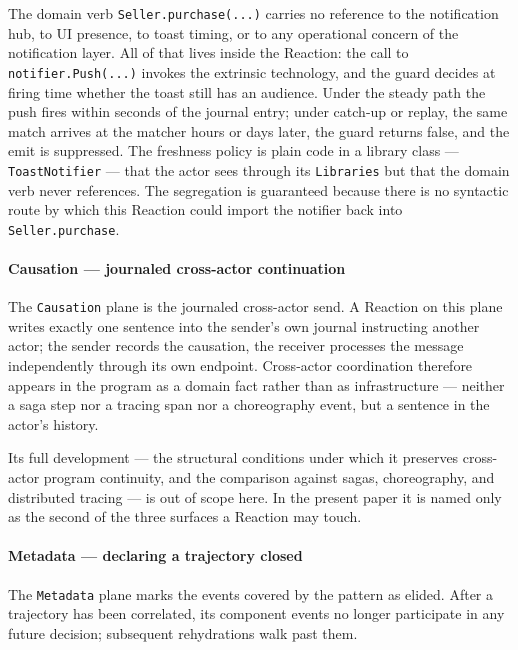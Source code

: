 \documentclass[
]{article}
\let\origtexttt\texttt%
\renewcommand{\texttt}[1]{\origtexttt{\seqsplit{#1}}}%
\let\texttt\origtexttt%
\begin{document}
The domain verb \texttt{Seller.purchase(...)} carries no reference to
the notification hub, to UI presence, to toast timing, or to any
operational concern of the notification layer. All of that lives inside
the Reaction: the call to \texttt{notifier.Push(...)} invokes the
extrinsic technology, and the guard decides at firing time whether the
toast still has an audience. Under the steady path the push fires within
seconds of the journal entry; under catch-up or replay, the same match
arrives at the matcher hours or days later, the guard returns false, and
the emit is suppressed. The freshness policy is plain code in a library
class --- \texttt{ToastNotifier} --- that the actor sees through its
\texttt{Libraries} but that the domain verb never references. The
segregation is guaranteed because there is no syntactic route by which
this Reaction could import the notifier back into
\texttt{Seller.purchase}.

\paragraph{Causation --- journaled cross-actor
continuation}\label{causation-journaled-cross-actor-continuation}

The \texttt{Causation} plane is the journaled cross-actor send. A
Reaction on this plane writes exactly one sentence into the sender's own
journal instructing another actor; the sender records the causation, the
receiver processes the message independently through its own endpoint.
Cross-actor coordination therefore appears in the program as a domain
fact rather than as infrastructure --- neither a saga step nor a tracing
span nor a choreography event, but a sentence in the actor's history.

Its full development --- the structural conditions under which it
preserves cross-actor program continuity, and the comparison against
sagas, choreography, and distributed tracing --- is out of scope here.
In the present paper it is named only as the second of the three
surfaces a Reaction may touch.

\paragraph{Metadata --- declaring a trajectory
closed}\label{metadata-declaring-a-trajectory-closed}

The \texttt{Metadata} plane marks the events covered by the pattern as
elided. After a trajectory has been correlated, its component events no
longer participate in any future decision; subsequent rehydrations walk
past them.
\end{document}
